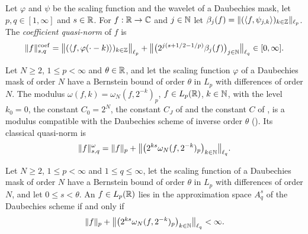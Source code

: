 \begin{definition}
\label{def:daub-coeff-norm}
\leanok
{}
Let $\varphi$ and $\psi$ be the scaling function and the wavelet of a Daubechies mask, let
$p, q \in [1, \infty]$ and $s \in \mathbb{R}$. For $f : \mathbb{R} \to \mathbb{C}$ and $j \in \mathbb{N}$ let
$\beta_j(f) = \|(\langle f, \psi_{j,k} \rangle)_{k \in \mathbb{Z}}\|_{\ell_p}$. The
\emph{coefficient quasi-norm} of $f$ is
\[
  \|f\|^{\mathrm{coef}}_{s,q}
  = \bigl\|(\langle f, \varphi(\cdot - k) \rangle)_{k \in \mathbb{Z}}\bigr\|_{\ell_p}
  + \bigl\|\bigl(2^{j(s + 1/2 - 1/p)} \beta_j(f)\bigr)_{j \in \mathbb{N}}\bigr\|_{\ell_q}
  \in [0, \infty] .
\]
\end{definition}

\begin{definition}
\label{def:daub-modulus-data}
\leanok
{}
Let $N \geq 2$, $1 \leq p < \infty$ and $\theta \in \mathbb{R}$, and let the scaling function $\varphi$ of
a Daubechies mask of order $N$ have a Bernstein bound of order $\theta$ in $L_p$ with differences
of order $N$. The modulus $\omega(f, k) = \omega_N(f, 2^{-k})_p$, $f \in L_p(\mathbb{R})$, $k \in \mathbb{N}$,
with the level $k_0 = 0$, the constant $C_0 = 2^N$, the constant $C_J$ of
 and the constant $C$ of , is a modulus
compatible with the Daubechies scheme of inverse order $\theta$ (). Its
classical quasi-norm is
\[
  \|f\|^{\omega}_{s,q} = \|f\|_p
  + \bigl\|\bigl(2^{ks} \omega_N(f, 2^{-k})_p\bigr)_{k \in \mathbb{N}}\bigr\|_{\ell_q} .
\]
\end{definition}

\begin{theorem}
\label{thm:daub-approx-modulus}
\leanok
{}
Let $N \geq 2$, $1 \leq p < \infty$ and $1 \leq q \leq \infty$, let the scaling function of a
Daubechies mask of order $N$ have a Bernstein bound of order $\theta$ in $L_p$ with differences of
order $N$, and let $0 \leq s < \theta$. An $f \in L_p(\mathbb{R})$ lies in the approximation space
$A^s_q$ of the Daubechies scheme if and only if
\[
  \|f\|_p + \bigl\|\bigl(2^{ks} \omega_N(f, 2^{-k})_p\bigr)_{k \in \mathbb{N}}\bigr\|_{\ell_q} < \infty .
\]
\end{theorem}

